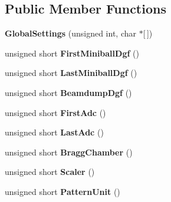 \subsection*{Public Member Functions}
\begin{DoxyCompactItemize}
\item 
\hypertarget{class_global_settings_a1c225d218e6d03979215f1a6204b7f4e}{{\bfseries Global\-Settings} (unsigned int, char $\ast$\mbox{[}$\,$\mbox{]})}\label{class_global_settings_a1c225d218e6d03979215f1a6204b7f4e}

\item 
\hypertarget{class_global_settings_a52a1e1677bc201c6b39835356293d85d}{unsigned short {\bfseries First\-Miniball\-Dgf} ()}\label{class_global_settings_a52a1e1677bc201c6b39835356293d85d}

\item 
\hypertarget{class_global_settings_aaadd8c6a7a474f0b9553ba19188eb264}{unsigned short {\bfseries Last\-Miniball\-Dgf} ()}\label{class_global_settings_aaadd8c6a7a474f0b9553ba19188eb264}

\item 
\hypertarget{class_global_settings_af0ff7c615f313cb54022cf6b5ddcdd23}{unsigned short {\bfseries Beamdump\-Dgf} ()}\label{class_global_settings_af0ff7c615f313cb54022cf6b5ddcdd23}

\item 
\hypertarget{class_global_settings_ad422d73434ae2ccc7b26ffed75d4f569}{unsigned short {\bfseries First\-Adc} ()}\label{class_global_settings_ad422d73434ae2ccc7b26ffed75d4f569}

\item 
\hypertarget{class_global_settings_a0b452889afe332aad1be1e9a74b58f4d}{unsigned short {\bfseries Last\-Adc} ()}\label{class_global_settings_a0b452889afe332aad1be1e9a74b58f4d}

\item 
\hypertarget{class_global_settings_a5590e2efb7c185568d151cb7172b58bc}{unsigned short {\bfseries Bragg\-Chamber} ()}\label{class_global_settings_a5590e2efb7c185568d151cb7172b58bc}

\item 
\hypertarget{class_global_settings_ac68f6e40bcec64f60cbdff06de507771}{unsigned short {\bfseries Scaler} ()}\label{class_global_settings_ac68f6e40bcec64f60cbdff06de507771}

\item 
\hypertarget{class_global_settings_a039a4d8e7a31e0c29f555ac862bd249f}{unsigned short {\bfseries Pattern\-Unit} ()}\label{class_global_settings_a039a4d8e7a31e0c29f555ac862bd249f}


\end{DoxyCompactItemize}
